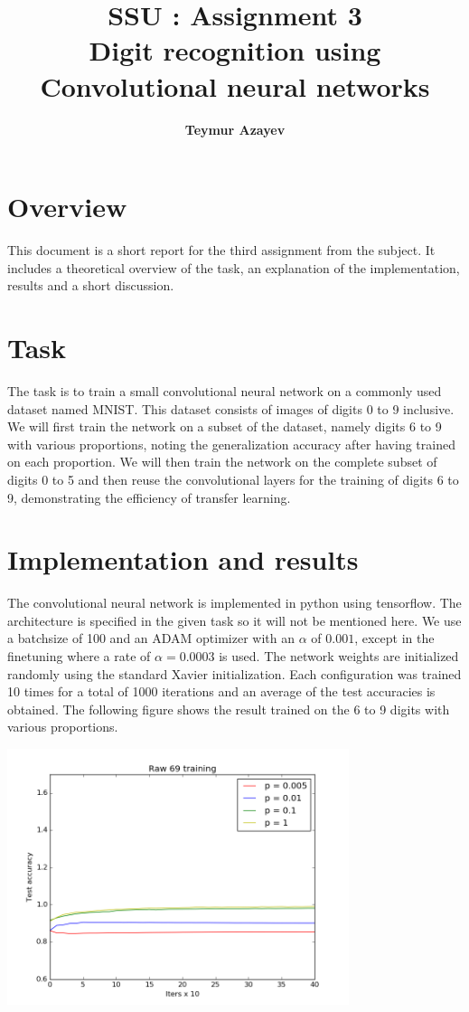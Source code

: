 \documentclass[11pt]{article}
\title{\textbf{SSU : Assignment 3} \\ \textbf{Digit recognition using Convolutional neural networks}}
\author{\textbf{Teymur Azayev}}
\date{}
\begin{document}
\maketitle

\section{Overview}
This document is a short report for the third assignment from the subject. It includes a theoretical overview of the task, an explanation of the implementation, results and a short discussion.

\section{Task}
The task is to train a small convolutional neural network on a commonly used dataset named MNIST.
This dataset consists of images of digits 0 to 9 inclusive.
We will first train the network on a subset of the dataset, namely digits 6 to 9 with various proportions,
noting the generalization accuracy after having trained on each proportion.
We will then train the network on the complete subset of digits 0 to 5 and then reuse the convolutional
layers for the training of digits 6 to 9, demonstrating the efficiency of transfer learning.

\section{Implementation and results} 
The convolutional neural network is implemented in python using tensorflow. The architecture is specified in the 
given task so it will not be mentioned here. We use a batchsize of 100 and an ADAM optimizer with an $\alpha$ of $0.001$, except in the finetuning where a rate of $\alpha = 0.0003$ is used. The network weights are initialized randomly using the standard Xavier initialization. Each configuration was trained 10 times for a total of 1000 iterations and an average of the test accuracies is obtained. The following figure shows the result trained on the 6 to 9 digits with various proportions.


\includegraphics[width=10cm]{Raw69training}
\end{document}

